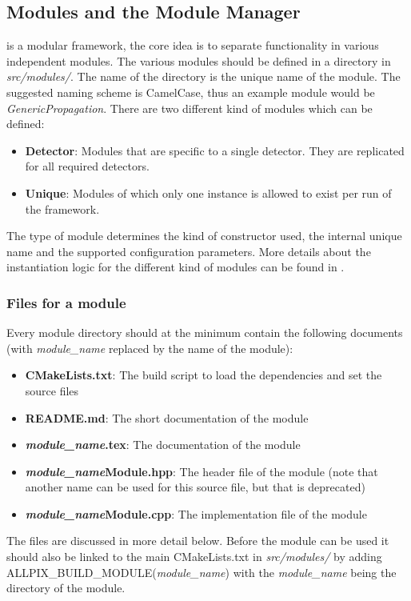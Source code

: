 \subsection{Modules and the Module Manager}
\label{sec:module_manager}
\apsq is a modular framework, the core idea is to separate functionality in various independent modules. The various modules should be defined in a directory in \textit{src/modules/}. The name of the directory is the unique name of the module. The suggested naming scheme is CamelCase, thus an example module would be \textit{GenericPropagation}. There are two different kind of modules which can be defined:
\begin{itemize}
\item \textbf{Detector}: Modules that are specific to a single detector. They are replicated for all required detectors.
\item \textbf{Unique}: Modules of which only one instance is allowed to exist per run of the framework.
\end{itemize}
The type of module determines the kind of constructor used, the internal unique name and the supported configuration parameters. More details about the instantiation logic for the different kind of modules can be found in \needref.

\subsubsection{Files for a module}
\label{sec:module_files}
Every module directory should at the minimum contain the following documents (with \textit{module\_name} replaced by the name of the module):
\begin{itemize}
\item \textbf{CMakeLists.txt}: The build script to load the dependencies and set the source files
\item \textbf{README.md}: The short documentation of the module
\item \textbf{\textit{module\_name}.tex}: The documentation of the module
\item \textbf{\textit{module\_name}Module.hpp}: The header file of the module (note that another name can be used for this source file, but that is deprecated)
\item \textbf{\textit{module\_name}Module.cpp}: The implementation file of the module
\end{itemize}
The files are discussed in more detail below. Before the module can be used it should also be linked to the main CMakeLists.txt in \textit{src/modules/} by adding \\ ALLPIX\_BUILD\_MODULE(\textit{module\_name}) with the \textit{module\_name} being the directory of the module. 

